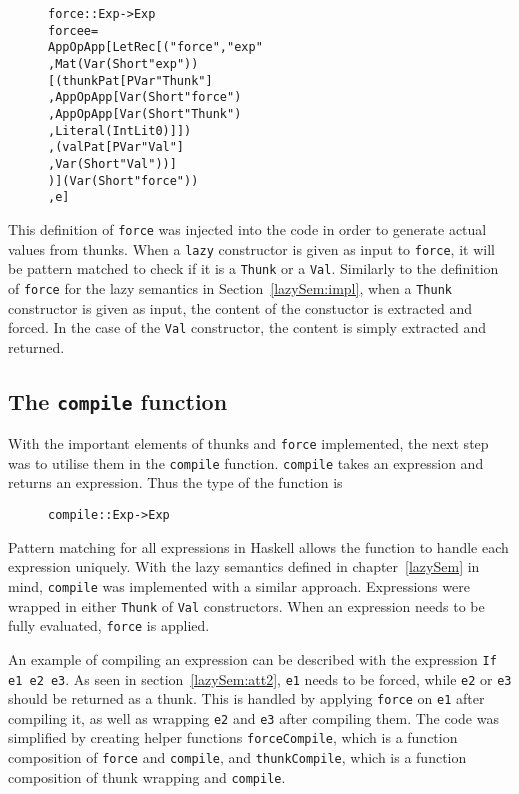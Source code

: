 \begin{figure}[H]
\begin{alltt}
force :: Exp -> Exp
force e =
  App OpApp [LetRec [("force", "exp"
                     , Mat (Var (Short "exp"))
                       [(thunkPat [PVar "Thunk"]
                        , App OpApp [Var (Short "force")
                                    , App OpApp [Var (Short "Thunk")
                                                , Literal (IntLit 0)]])
                       ,(valPat [PVar "Val"]
                        , Var (Short "Val"))]
                     )] (Var (Short "force"))
            , e]
\end{alltt}
\end{figure}

\noindent This definition of \texttt{force} was injected into the code in order
to generate actual values from thunks. When a \texttt{lazy} constructor is given
as input to \texttt{force}, it will be pattern matched to check if it is a
\texttt{Thunk} or a \texttt{Val}. Similarly to the definition of \texttt{force}
for the lazy semantics in Section~\ref{lazySem:impl}, when a \texttt{Thunk}
constructor is given as input, the content of the constuctor is extracted and
forced. In the case of the \texttt{Val} constructor, the content is simply
extracted and returned.

\subsection{The \texttt{compile} function}
With the important elements of thunks and \texttt{force} implemented, the next
step was to utilise them in the \texttt{compile} function. 
\texttt{compile} takes an expression and returns an expression. Thus the type of
the function is

\begin{figure}[H]
\begin{alltt}
  compile :: Exp -> Exp
\end{alltt}
\end{figure}

\noindent Pattern matching for all expressions in Haskell allows the function to
handle each expression uniquely. With the lazy semantics defined in
chapter~\ref{lazySem} in mind, \texttt{compile} was implemented with a similar
approach. Expressions were wrapped in either \texttt{Thunk} of
\texttt{Val} constructors. When an expression needs to be fully evaluated,
\texttt{force} is applied.

An example of compiling an expression can be described with the expression
\texttt{If e1 e2 e3}. As seen in section~\ref{lazySem:att2}, \texttt{e1} needs
to be forced, while \texttt{e2} or \texttt{e3} should be returned as a thunk.
This is handled by applying \texttt{force} on \texttt{e1} after compiling it,
as well as wrapping \texttt{e2} and \texttt{e3} after compiling them.
The code was simplified by creating helper functions \texttt{forceCompile},
which is a function composition of \texttt{force} and \texttt{compile}, and
\texttt{thunkCompile}, which is a function composition of thunk wrapping and
\texttt{compile}.

